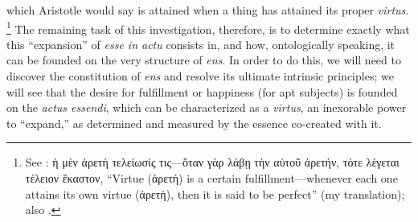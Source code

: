 %
which Aristotle would say is attained when a thing has attained its proper \emph{virtus}.%
%
\footnote{See \cite[Η,~2, 264a13-15]{aristotle:physics}: ἡ μὲν ἀρετὴ τελείωσίς τις—ὅταν γὰρ λάβῃ τὴν αὑτοῦ ἀρετήν, τότε λέγεται τέλειον ἕκαστον, “Virtue (ἀρετή) is a certain fulfillment—whenever each one attains its own virtue (ἀρετή), then it is said to be perfect” (my translation); also \cite[34]{orourke:virtus}.}
%
The remaining task of this investigation, therefore, is to determine exactly what this “expansion” of \emph{esse in actu} consists in, and how, ontologically speaking, it can be founded on the very structure of \emph{ens}. In order to do this, we will need to discover the constitution of \emph{ens} and resolve its ultimate intrinsic principles; we will see that the desire for fulfillment or happiness (for apt subjects) is founded on the \emph{actus essendi}, which can be characterized as a \emph{virtus}, an inexorable power to “expand,” as determined and measured by the essence co-created with it.

